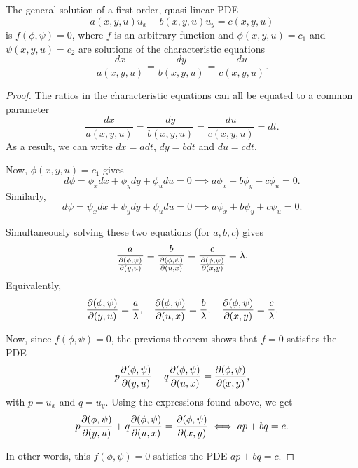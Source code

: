 \documentclass[11pt]{penrose}
\begin{document}
\begin{nthm}
    The general solution of a first order, quasi-linear PDE
    \begin{equation}
        a(x,y,u) u_x + b(x,y,u) u_y = c(x,y,u)
    \end{equation}
    is $f(\phi, \psi) = 0$, where $f$ is an arbitrary function and $\phi(x,y,u)=c_1$ and $\psi(x,y,u)=c_2$ are solutions of the characteristic equations
    \begin{equation}
        \frac{dx}{a(x,y,u)} = \frac{dy}{b(x,y,u)} = \frac{du}{c(x,y,u)}.
    \end{equation}
\end{nthm}
\begin{proof}
    The ratios in the characteristic equations can all be equated to a common parameter
    \begin{equation}
        \frac{dx}{a(x,y,u)} = \frac{dy}{b(x,y,u)} = \frac{du}{c(x,y,u)} = dt.
    \end{equation}
    As a result, we can write $dx = a dt$, $dy = b dt$ and $du = c dt$.

    Now, $\phi(x,y,u) = c_1$ gives
    \begin{equation}
        d\phi = \phi_x dx + \phi_y dy + \phi_u du = 0
        \implies a \phi_x + b \phi_y + c \phi_u = 0.
    \end{equation}
    Similarly,
    \begin{equation}
        d\psi = \psi_x dx + \psi_y dy + \psi_u du = 0
        \implies a \psi_x + b \psi_y + c \psi_u = 0.
    \end{equation}

    Simultaneously solving these two equations (for $a, b, c$) gives
    \begin{equation}
        \frac{a}{\frac{\partial(\phi, \psi)}{\partial(y,u)}} = \frac{b}{\frac{\partial(\phi, \psi)}{\partial(u,x)}} = \frac{c}{\frac{\partial(\phi, \psi)}{\partial(x,y)}} = \lambda.
    \end{equation}
    Equivalently,
    \begin{equation}
        \frac{\partial(\phi, \psi)}{\partial(y,u)} = \frac{a}{\lambda}, \quad
        \frac{\partial(\phi, \psi)}{\partial(u,x)} = \frac{b}{\lambda}, \quad
        \frac{\partial(\phi, \psi)}{\partial(x,y)} = \frac{c}{\lambda}.
    \end{equation}

    Now, since $f(\phi, \psi) = 0$, the previous theorem shows that $f = 0$ satisfies the PDE
    \begin{equation}
        p \frac{\partial(\phi, \psi)}{\partial(y,u)}
        + q \frac{\partial(\phi, \psi)}{\partial(u,x)}
        = \frac{\partial(\phi, \psi)}{\partial(x,y)},
    \end{equation}
    with $p = u_x$ and $q = u_y$. Using the expressions found above, we get
    \begin{equation}
        p \frac{\partial(\phi, \psi)}{\partial(y,u)}
        + q \frac{\partial(\phi, \psi)}{\partial(u,x)}
        = \frac{\partial(\phi, \psi)}{\partial(x,y)}
        \iff
        a p + b q = c.
    \end{equation}

    In other words, this $f(\phi,\psi) = 0$ satisfies the PDE $ap + bq = c$.
\end{proof}
\end{document}

